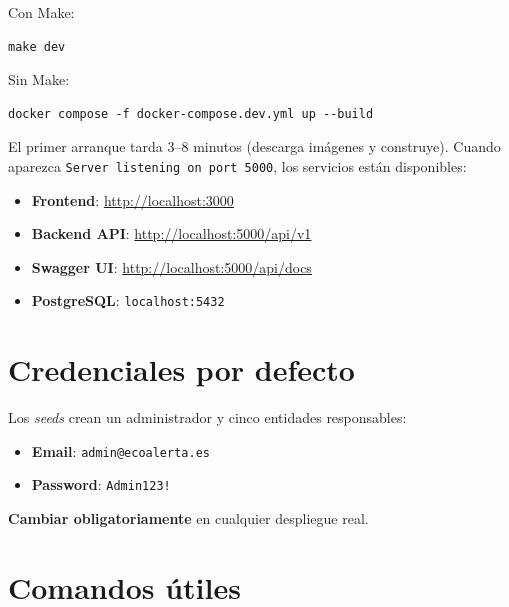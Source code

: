 Con Make:
\begin{lstlisting}[basicstyle=\ttfamily\small, frame=single, backgroundcolor=\color{gray!5}]
make dev
\end{lstlisting}

Sin Make:
\begin{lstlisting}[basicstyle=\ttfamily\small, frame=single, backgroundcolor=\color{gray!5}]
docker compose -f docker-compose.dev.yml up --build
\end{lstlisting}

El primer arranque tarda 3--8 minutos (descarga imágenes y construye). Cuando aparezca \texttt{Server listening on port 5000}, los servicios están disponibles:

\begin{itemize}[leftmargin=1.2cm, itemsep=2pt]
  \item \textbf{Frontend}: \url{http://localhost:3000}
  \item \textbf{Backend API}: \url{http://localhost:5000/api/v1}
  \item \textbf{Swagger UI}: \url{http://localhost:5000/api/docs}
  \item \textbf{PostgreSQL}: \texttt{localhost:5432}
\end{itemize}


\section*{Credenciales por defecto}

Los \textit{seeds} crean un administrador y cinco entidades responsables:

\begin{itemize}[leftmargin=1.2cm, itemsep=2pt]
  \item \textbf{Email}: \texttt{admin@ecoalerta.es}
  \item \textbf{Password}: \texttt{Admin123!}
\end{itemize}

\textbf{Cambiar obligatoriamente} en cualquier despliegue real.


\section*{Comandos útiles}

